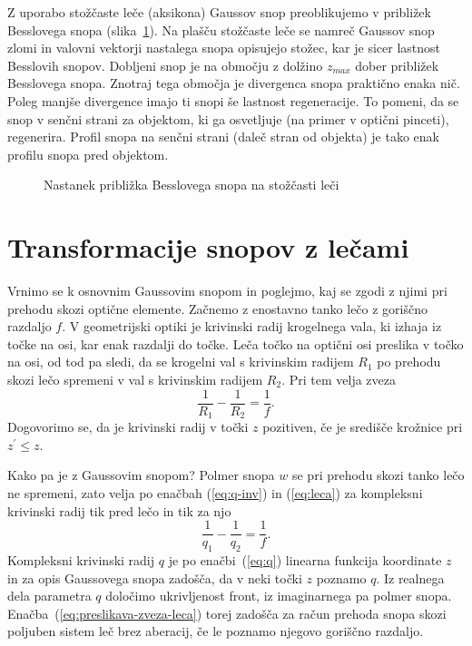 \begin{remark}
Z uporabo stožčaste leče (aksikona) Gaussov snop
preoblikujemo v približek Besslovega snopa (slika~\ref{fig:Bessel_leca}). 
Na plašču stožčaste leče se namreč Gaussov snop zlomi in valovni vektorji 
nastalega snopa opisujejo stožec, kar je sicer lastnost Besslovih snopov.
Dobljeni snop je na območju z dolžino $z_{max}$ dober približek Besslovega snopa.
Znotraj tega območja je divergenca snopa praktično enaka nič. Poleg manjše divergence
imajo ti snopi še lastnost regeneracije. To pomeni, da se snop v senčni strani
za objektom, ki ga osvetljuje (na primer v optični pinceti), regenerira. 
Profil snopa na senčni strani (daleč stran od objekta) je tako enak profilu 
snopa pred objektom. 
\begin{figure}[h]
\centering
\def\svgwidth{90truemm} 

\caption{Nastanek približka Besslovega snopa na stožčasti leči}
\label{fig:Bessel_leca}
\end{figure}
\end{remark}

\section{Transformacije snopov z lečami}

Vrnimo se k osnovnim Gaussovim snopom in poglejmo, kaj se zgodi z njimi pri prehodu
skozi optične elemente. Začnemo
z enostavno tanko lečo z goriščno razdaljo $f$. V geometrijski optiki
je krivinski radij krogelnega vala, ki izhaja iz točke na osi, kar
enak razdalji do točke. Leča točko na optični osi preslika v točko na osi,
od tod pa sledi, da se krogelni val s krivinskim radijem $R_{1}$
po prehodu skozi lečo spremeni v val s krivinskim radijem $R_{2}$.
Pri tem velja zveza 
\begin{equation}
\frac{1}{R_{1}}-\frac{1}{R_{2}}=\frac{1}{f}.
\label{eq:leca}
\end{equation}
Dogovorimo se, da je krivinski radij v točki $z$ pozitiven, če je središče krožnice pri $z^{\prime}\le z$.

Kako pa je z Gaussovim snopom? Polmer snopa $w$ se pri prehodu 
skozi tanko lečo ne spremeni, zato velja po enačbah (\ref{eq:q-inv}) in 
(\ref{eq:leca}) za kompleksni krivinski radij tik pred lečo in tik za njo
\begin{equation}
\frac{1}{q_{1}}-\frac{1}{q_{2}}=\frac{1}{f}.
\label{eq:preslikava-zveza-leca}
\end{equation}
Kompleksni krivinski radij $q$ je po enačbi~(\ref{eq:q}) linearna 
funkcija koordinate $z$ in za opis Gaussovega snopa zadošča, da
v neki točki $z$ poznamo $q$. Iz realnega dela parametra $q$ določimo ukrivljenost front, iz 
imaginarnega pa polmer snopa. Enačba~(\ref{eq:preslikava-zveza-leca}) torej
zadošča za račun prehoda snopa skozi poljuben sistem leč brez aberacij, če le poznamo
njegovo goriščno razdaljo.

